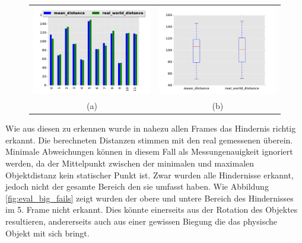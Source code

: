 \begin{figure}[h]
	\centering
	\begin{tabular}{cc}
	\includegraphics[width=7cm]{img/evaluation/diagrams/sub_big_bar}&
	\includegraphics[width=7cm]{img/evaluation/diagrams/sub_big_box}\\
	 (a) & (b)
	\end{tabular}
	\caption{}
    \label{fig:eval_big}
\end{figure}

\noindent
Wie aus diesen zu erkennen wurde in nahezu allen Frames das Hindernis richtig erkannt. Die berechneten Distanzen stimmen mit den real gemessenen überein. Minimale Abweichungen können in diesem Fall als Messungenauigkeit ignoriert werden, da der Mittelpunkt zwischen der minimalen und maximalen Objektdistanz kein statischer Punkt ist. Zwar wurden alle Hindernisse erkannt, jedoch nicht der gesamte Bereich den sie umfasst haben. Wie Abbildung \ref{fig:eval_big_fails} zeigt wurden der obere und untere Bereich des Hindernisses im 5. Frame nicht erkannt. Dies könnte einerseits aus der Rotation des Objektes resultieren, andererseits auch aus einer gewissen Biegung die das physische Objekt mit sich bringt.

